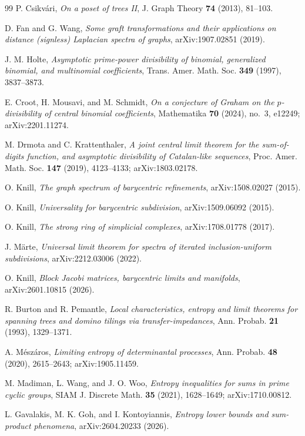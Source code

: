 \documentclass[11pt]{article}
\theoremstyle{definition}
\begin{document}
\begin{thebibliography}{99}
 P. Csikv\'ari, \emph{On a poset of trees II}, J. Graph Theory \textbf{74} (2013), 81--103.

 D. Fan and G. Wang, \emph{Some graft transformations and their applications on distance (signless) Laplacian spectra of graphs}, arXiv:1907.02851 (2019).

 J. M. Holte, \emph{Asymptotic prime-power divisibility of binomial, generalized binomial, and multinomial coefficients}, Trans. Amer. Math. Soc. \textbf{349} (1997), 3837--3873.

 E. Croot, H. Mousavi, and M. Schmidt, \emph{On a conjecture of Graham on the $p$-divisibility of central binomial coefficients}, Mathematika \textbf{70} (2024), no.~3, e12249; arXiv:2201.11274.

 M. Drmota and C. Krattenthaler, \emph{A joint central limit theorem for the sum-of-digits function, and asymptotic divisibility of Catalan-like sequences}, Proc. Amer. Math. Soc. \textbf{147} (2019), 4123--4133; arXiv:1803.02178.

 O. Knill, \emph{The graph spectrum of barycentric refinements}, arXiv:1508.02027 (2015).

 O. Knill, \emph{Universality for barycentric subdivision}, arXiv:1509.06092 (2015).

 O. Knill, \emph{The strong ring of simplicial complexes}, arXiv:1708.01778 (2017).

 J. M\"arte, \emph{Universal limit theorem for spectra of iterated inclusion-uniform subdivisions}, arXiv:2212.03006 (2022).

 O. Knill, \emph{Block Jacobi matrices, barycentric limits and manifolds}, arXiv:2601.10815 (2026).

 R. Burton and R. Pemantle, \emph{Local characteristics, entropy and limit theorems for spanning trees and domino tilings via transfer-impedances}, Ann. Probab. \textbf{21} (1993), 1329--1371.

 A. M\'esz\'aros, \emph{Limiting entropy of determinantal processes}, Ann. Probab. \textbf{48} (2020), 2615--2643; arXiv:1905.11459.

 M. Madiman, L. Wang, and J. O. Woo, \emph{Entropy inequalities for sums in prime cyclic groups}, SIAM J. Discrete Math. \textbf{35} (2021), 1628--1649; arXiv:1710.00812.

 L. Gavalakis, M. K. Goh, and I. Kontoyiannis, \emph{Entropy lower bounds and sum-product phenomena}, arXiv:2604.20233 (2026).


\end{thebibliography}
\end{document}
